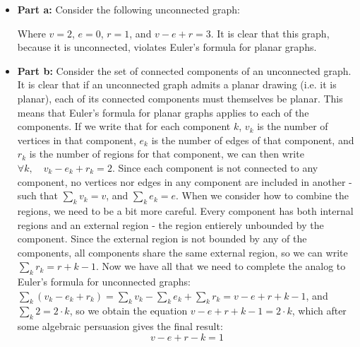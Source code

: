 \documentclass{article}
\begin{document}
\begin{solution}
\begin{itemize}
	\item[]{\textbf{Part a:}} Consider the following unconnected graph:
		\vskip 0.15in \noindent
		\vskip 0.15in \noindent
		Where $v = 2$, $e = 0$, $r = 1$, and $v - e + r = 3$.  It is clear that this graph, 		because it is unconnected, violates Euler's formula for planar graphs.
	\item[]{\textbf{Part b:}} Consider the set of connected components of an unconnected graph.  It is clear that if an unconnected graph admits a planar drawing (i.e. it is planar), each of its connected components must themselves be planar.  This means that Euler's formula for planar graphs applies to each of the components. If we write that for each component $k$, $v_k$ is the number of vertices in that component, $e_k$ is the number of edges of that component, and $r_k$ is the number of regions for that component, we can then write $\forall k, \quad v_k-e_k+r_k=2$.  Since each component is not connected to any component, no vertices nor edges in any component are included in another - such that $\sum_k v_k = v$, and $\sum_k e_k = e$.  When we consider how to combine the regions, we need to be a bit more careful.  Every component has both internal regions and an external region - the region entierely unbounded by the component.  Since the external region is not bounded by any of the components, all components share the same external region, so we can write $\sum_k r_k = r + k - 1$. Now we have all that we need to complete the analog to Euler's formula for unconnected graphs: $\sum_k (v_k-e_k+r_k) = \sum_k v_k - \sum_k e_k + \sum_k r_k = v - e + r + k - 1$,  and $\sum_k 2 = 2 \cdot k$, so we obtain the equation $v-e+r+k-1=2\cdot k$, which after some algebraic persuasion gives the final result:
$$v-e+r-k=1$$
	
\end{itemize}
\end{solution}
\end{document}
